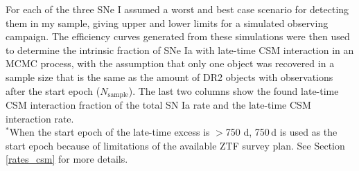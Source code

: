 \documentclass[a4paper,oneside,12pt, class=Latex/Classes/PhDthesisPSnPDF, crop=false]{standalone}
\begin{document}
\begin{table}
 \centering
 \caption{Parameters used for rate estimation simulations for each object.}
\begin{flushleft}
For each of the three SNe I assumed a worst and best case scenario for detecting them in my sample, giving upper and lower limits for a simulated observing campaign. The efficiency curves generated from these simulations were then used to determine the intrinsic fraction of SNe Ia with late-time CSM interaction in an MCMC process, with the assumption that only one object was recovered in a sample size that is the same as the amount of DR2 objects with observations after the start epoch ($N_\text{sample}$). The last two columns show the found late-time CSM interaction fraction of the total SN Ia rate and the late-time CSM interaction rate.\\
$^*$When the start epoch of the late-time excess is $>$750 d, 750\,d is used as the start epoch because of limitations of the available ZTF survey plan. See Section \ref{rates_csm} for more details.\\
\end{flushleft} 
 \label{rate_sims}
\end{table}
\end{document}
